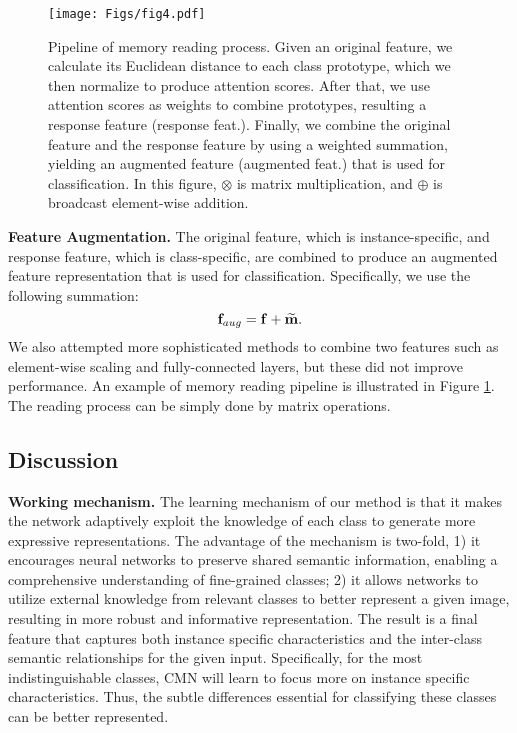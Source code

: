 \documentclass[journal]{IEEEtran}
\begin{document}
\begin{figure}[t]
\begin{center}
\texttt{[image: Figs/fig4.pdf]}
\end{center}
\caption{Pipeline of memory reading process. Given an original feature, we calculate its Euclidean distance to each class prototype, which we then normalize to produce attention scores. After that, we use attention scores as weights to combine prototypes, resulting a response feature (response feat.). Finally, we combine the original feature and the response feature by using a weighted summation, yielding an augmented feature (augmented feat.) that is used for classification. In this figure, $\otimes$ is matrix multiplication, and $\oplus$ is broadcast element-wise addition.}
\label{fig:4}
\end{figure}


 \textbf{Feature Augmentation.} The original feature, which is instance-specific, and response feature, which is class-specific, are combined to produce an augmented feature representation that is used for classification.
 Specifically, we use the following summation:
\begin{equation}
    {\bf f}_{aug} =  \bf f +  \widetilde{\bf m}.
    \label{final feature}
\end{equation} We also attempted more sophisticated methods to combine two features such as element-wise scaling and fully-connected layers, but these did not improve performance. An example of memory reading pipeline is illustrated in Figure \ref{fig:4}. The reading process can be simply done by matrix operations.



\subsection{Discussion}
\textbf{Working mechanism.} The learning mechanism of our method is that it makes the network adaptively exploit the knowledge of each class to generate more expressive representations. The advantage of the mechanism is two-fold, 1) it encourages neural networks to preserve shared semantic information, enabling a comprehensive understanding of fine-grained classes; 2) it allows networks to utilize external knowledge from relevant classes to better represent a given image, resulting in more robust and informative representation. The result is a final feature that captures both instance specific characteristics and the inter-class semantic relationships for the given input. Specifically, for the most indistinguishable classes, CMN will learn to focus more on instance specific characteristics. Thus, the subtle differences essential for classifying these classes can be better represented. 
\end{document}
